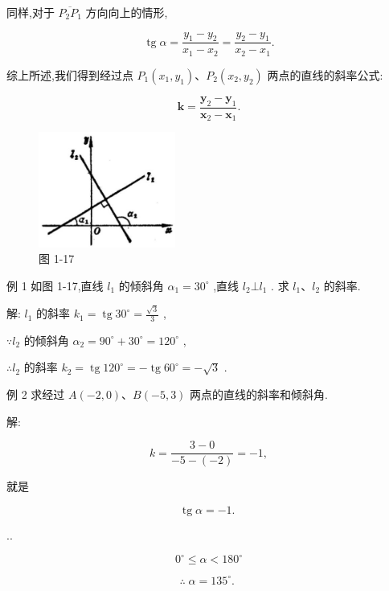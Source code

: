 \documentclass[lang=cn,newtx,10pt,scheme=chinese]{elegantbook}
\begin{document}
同样,对于 \(\overline{{P}_{2}{P}_{1}}\) 方向向上的情形,

\[
  \operatorname{tg}\alpha = \frac{{y}_{1} - {y}_{2}}{{x}_{1} - {x}_{2}} = \frac{{y}_{2} - {y}_{1}}{{x}_{2} - {x}_{1}}.
\]

综上所述,我们得到经过点 \({P}_{1}\left( {{x}_{1},{y}_{1}}\right) \text{、}{P}_{2}\left( {{x}_{2},{y}_{2}}\right)\) 两点的直线的斜率公式:

\[
  \mathbf{k} = \frac{{\mathbf{y}}_{2} - {\mathbf{y}}_{1}}{{\mathbf{x}}_{2} - {\mathbf{x}}_{1}}.
\]

\begin{figure}[h]
  \centering
  \includegraphics[max width=0.4\textwidth]{images/01912cc2-ffb6-728e-9ae7-b113ff05c64b_21_706247.jpg}
  \caption{图 1-17}
\end{figure}



例 1 如图 1-17,直线 \({l}_{1}\) 的倾斜角 \({\alpha }_{1} = {30}^{ \circ }\) ,直线 \({l}_{2} \bot {l}_{1}\) . 求 \({l}_{1}\text{、}{l}_{2}\) 的斜率.

解: \({l}_{1}\) 的斜率 \({k}_{1} = \operatorname{tg}{30}^{ \circ } = \frac{\sqrt{3}}{3}\) ,

\(\because {l}_{2}\) 的倾斜角 \({\alpha }_{2} = {90}^{ \circ } + {30}^{ \circ } = {120}^{ \circ }\) ,

\(\therefore {l}_{2}\) 的斜率 \({k}_{2} = \operatorname{tg}{120}^{ \circ } = - \operatorname{tg}{60}^{ \circ } = - \sqrt{3}\) .

例 2 求经过 \(A\left( {-2,0}\right) \text{、}B\left( {-5,3}\right)\) 两点的直线的斜率和倾斜角.

解:

\[
  k = \frac{3 - 0}{-5 - \left( {-2}\right) } = - 1,
\]

就是

\[
  \operatorname{tg}\alpha = - 1\text{. }
\]

..

\[
    {0}^{ \circ } \leq \alpha < {180}^{ \circ }
\]

\[
  \therefore \;\alpha = {135}^{ \circ }\text{. }
\]
\end{document}
